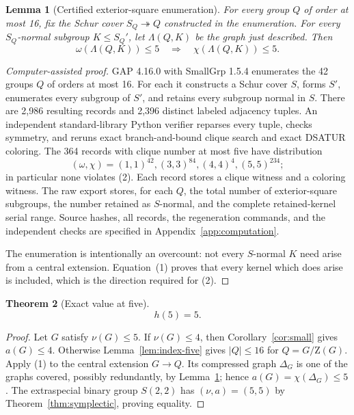 \documentclass[11pt]{article}
\newtheorem{theorem}{Theorem}[section]
\newtheorem{lemma}[theorem]{Lemma}
\theoremstyle{remark}
\newcommand{\nuG}{\nu}
\newcommand{\aG}{a}
\newcommand{\Z}{\mathrm Z}
\begin{document}
\begin{lemma}[Certified exterior-square enumeration]
\label{lem:h5-enumeration}
For every group $Q$ of order at most 16, fix the Schur cover
$S_Q\twoheadrightarrow Q$ constructed in the enumeration. For every
$S_Q$-normal subgroup $K\le S_Q'$, let
$\Lambda(Q,K)$ be the graph just described.  Then
\[
 \omega(\Lambda(Q,K))\le5\quad\Longrightarrow\quad
 \chi(\Lambda(Q,K))\le5.                                    \tag{2}
\]
\end{lemma}

\begin{proof}[Computer-assisted proof]
GAP 4.16.0 with SmallGrp 1.5.4 enumerates the 42 groups $Q$ of orders at
most 16.  For each it constructs a Schur cover $S$, forms $S'$, enumerates
every subgroup of $S'$, and retains every subgroup normal in $S$.  There
are 2,986 resulting records and 2,396 distinct labeled adjacency tuples.
An independent standard-library Python verifier reparses every tuple,
checks symmetry, and reruns exact branch-and-bound clique search and exact
DSATUR coloring.  The 364 records with clique number at most five have
distribution
\[
 (\omega,\chi)=(1,1)^{42},(3,3)^{84},(4,4)^4,(5,5)^{234};
\]
in particular none violates (2).  Each record stores a clique witness and
a coloring witness.  The raw export stores, for each $Q$, the total number
of exterior-square subgroups, the number retained as $S$-normal, and the
complete retained-kernel serial range.  Source hashes, all records, the
regeneration commands, and the independent checks are specified in
Appendix~\ref{app:computation}.

The enumeration is intentionally an overcount: not every $S$-normal $K$
need arise from a central extension.  Equation~(1) proves that every kernel
which does arise is included, which is the direction required for (2).
\end{proof}

\begin{theorem}[Exact value at five]\label{thm:h5}
\[
 h(5)=5.
\]
\end{theorem}

\begin{proof}
Let $G$ satisfy $\nuG(G)\le5$.  If $\nuG(G)\le4$, then
Corollary~\ref{cor:small} gives $\aG(G)\le4$.  Otherwise
Lemma~\ref{lem:index-five} gives $|Q|\le16$ for $Q=G/\Z(G)$.
Apply (1) to the central extension $G\to Q$.  Its compressed graph
$\Delta_G$ is one of the graphs covered, possibly redundantly, by
Lemma~\ref{lem:h5-enumeration}; hence
$\aG(G)=\chi(\Delta_G)\le5$.  The extraspecial binary group $S(2,2)$ has
$(\nuG,\aG)=(5,5)$ by Theorem~\ref{thm:symplectic}, proving equality.
\end{proof}
\end{document}
